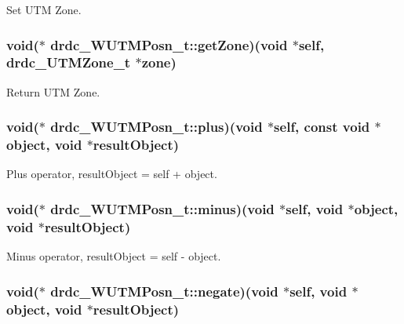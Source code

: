 Set UTM Zone. 

\hypertarget{structdrdc__WUTMPosn__t_391cac345775ffc92734126d33ddbc63}{
\subsubsection[getZone]{\setlength{\rightskip}{0pt plus 5cm}void($\ast$ {\bf drdc\_\-WUTMPosn\_\-t::getZone})(void $\ast$self, {\bf drdc\_\-UTMZone\_\-t} $\ast${\bf zone})}}
\label{structdrdc__WUTMPosn__t_391cac345775ffc92734126d33ddbc63}


Return UTM Zone. 

\hypertarget{structdrdc__WUTMPosn__t_eaf4db1b5ceb35b7f4adb96973cd84fb}{
\subsubsection[plus]{\setlength{\rightskip}{0pt plus 5cm}void($\ast$ {\bf drdc\_\-WUTMPosn\_\-t::plus})(void $\ast$self, const void $\ast$object, void $\ast$resultObject)}}
\label{structdrdc__WUTMPosn__t_eaf4db1b5ceb35b7f4adb96973cd84fb}


Plus operator, resultObject = self + object. 

\hypertarget{structdrdc__WUTMPosn__t_954f69b19638b4636527e3e3586c3335}{
\subsubsection[minus]{\setlength{\rightskip}{0pt plus 5cm}void($\ast$ {\bf drdc\_\-WUTMPosn\_\-t::minus})(void $\ast$self, void $\ast$object, void $\ast$resultObject)}}
\label{structdrdc__WUTMPosn__t_954f69b19638b4636527e3e3586c3335}


Minus operator, resultObject = self - object. 

\hypertarget{structdrdc__WUTMPosn__t_597ecc0b559b3a8ce183403149e56fd1}{
\subsubsection[negate]{\setlength{\rightskip}{0pt plus 5cm}void($\ast$ {\bf drdc\_\-WUTMPosn\_\-t::negate})(void $\ast$self, void $\ast$object, void $\ast$resultObject)}}
\label{structdrdc__WUTMPosn__t_597ecc0b559b3a8ce183403149e56fd1}


